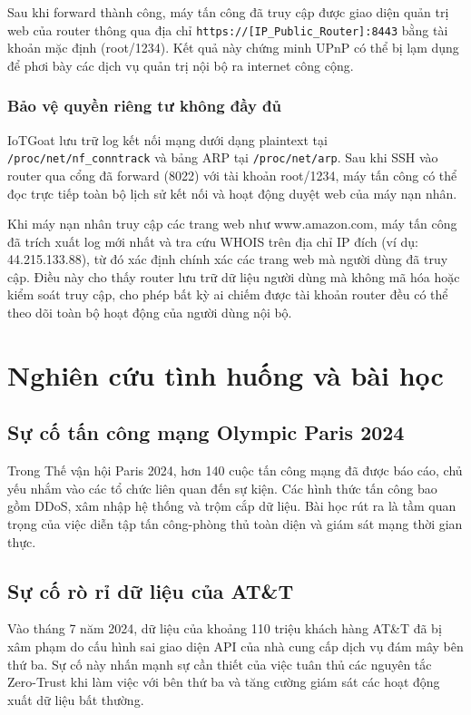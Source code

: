 \documentclass[conference]{IEEEtran}
\begin{document}
Sau khi forward thành công, máy tấn công đã truy cập được giao diện quản trị web của router thông qua địa chỉ \texttt{https://[IP\_Public\_Router]:8443} bằng tài khoản mặc định (root/1234). Kết quả này chứng minh UPnP có thể bị lạm dụng để phơi bày các dịch vụ quản trị nội bộ ra internet công cộng.


\subsubsection{Bảo vệ quyền riêng tư không đầy đủ}
IoTGoat lưu trữ log kết nối mạng dưới dạng plaintext tại \texttt{/proc/net/nf\_conntrack} và bảng ARP tại \texttt{/proc/net/arp}. Sau khi SSH vào router qua cổng đã forward (8022) với tài khoản root/1234, máy tấn công có thể đọc trực tiếp toàn bộ lịch sử kết nối và hoạt động duyệt web của máy nạn nhân.

Khi máy nạn nhân truy cập các trang web như www.amazon.com, máy tấn công đã trích xuất log mới nhất và tra cứu WHOIS trên địa chỉ IP đích (ví dụ: 44.215.133.88), từ đó xác định chính xác các trang web mà người dùng đã truy cập. Điều này cho thấy router lưu trữ dữ liệu người dùng mà không mã hóa hoặc kiểm soát truy cập, cho phép bất kỳ ai chiếm được tài khoản router đều có thể theo dõi toàn bộ hoạt động của người dùng nội bộ.


\section{Nghiên cứu tình huống và bài học}
\subsection{Sự cố tấn công mạng Olympic Paris 2024}
Trong Thế vận hội Paris 2024, hơn 140 cuộc tấn công mạng đã được báo cáo, chủ yếu nhắm vào các tổ chức liên quan đến sự kiện. Các hình thức tấn công bao gồm DDoS, xâm nhập hệ thống và trộm cắp dữ liệu. Bài học rút ra là tầm quan trọng của việc diễn tập tấn công-phòng thủ toàn diện và giám sát mạng thời gian thực.

\subsection{Sự cố rò rỉ dữ liệu của AT\&T}
Vào tháng 7 năm 2024, dữ liệu của khoảng 110 triệu khách hàng AT\&T đã bị xâm phạm do cấu hình sai giao diện API của nhà cung cấp dịch vụ đám mây bên thứ ba. Sự cố này nhấn mạnh sự cần thiết của việc tuân thủ các nguyên tắc Zero-Trust khi làm việc với bên thứ ba và tăng cường giám sát các hoạt động xuất dữ liệu bất thường.
\end{document}
